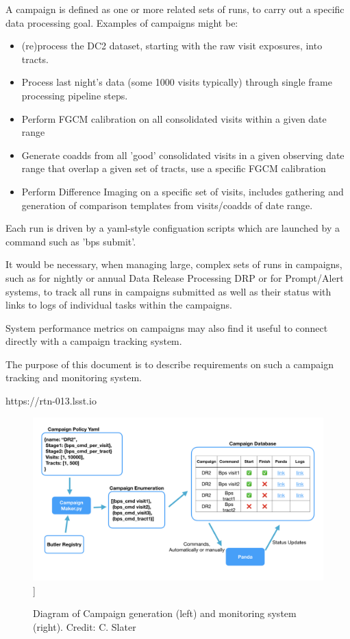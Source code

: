 \documentclass[DM,authoryear,toc]{lsstdoc}
\begin{document}
A campaign is defined as one or more related sets of runs, to carry out a
specific data processing goal.  Examples of campaigns might be:

\begin{itemize}

\item (re)process the DC2 dataset, starting with the raw visit exposures,
 into tracts.  

\item Process last night's data (some 1000 visits typically) through
single frame processing pipeline steps.

\item Perform FGCM calibration on all consolidated visits within a given
date range

\item Generate coadds from all 'good' consolidated visits in a given observing
date range that overlap a given set of tracts, use a specific FGCM calibration 

\item Perform Difference Imaging on a specific set of visits, includes gathering
and generation of comparison templates from visits/coadds of date range.


\end{itemize} 

Each run is driven by a yaml-style configuation scripts which are launched
by a command such as 'bps submit'.

It would be necessary, when managing large, complex sets of runs in campaigns, 
such as for nightly or annual Data Release Processing DRP or for 
Prompt/Alert systems, to track all runs in campaigns submitted as well as their 
status with links to logs of individual tasks within the campaigns.  

System performance metrics on campaigns may also find it useful to 
connect directly with 
a campaign tracking system.

The purpose of this document is to describe requirements on such a campaign
tracking and monitoring system.

https://rtn-013.lsst.io

\begin{figure}
\includegraphics[width=\textwidth]{CampaignTooling.jpg}]
\caption{Diagram of Campaign generation (left) and monitoring system (right).
Credit: C. Slater}
\end{figure}
\end{document}
